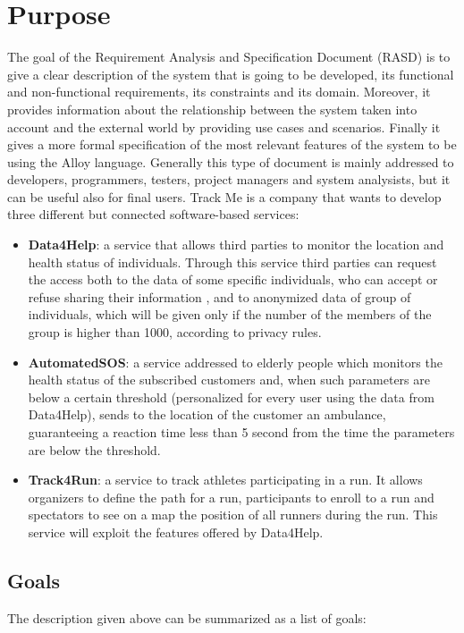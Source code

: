 \section{Purpose}
The  goal of the Requirement Analysis and Specification Document (RASD) is to give a clear description of the system that is going to be developed, its functional and non-functional requirements, its constraints and its domain. Moreover, it provides information about the relationship between the system taken into account and the external world by providing use cases and scenarios. Finally it gives a more formal specification of the most relevant features of the system to be using the Alloy language.
Generally this type of document is mainly addressed to developers, programmers, testers, project managers and system analysists, but it can be useful also for final users.
Track Me is a company that wants to develop three different but connected software-based services:
\begin{itemize}
  \item \textbf{Data4Help}: a service that allows third parties to monitor the location and health status of individuals. Through this service third parties can request the access both to the data of some specific individuals, who can accept or refuse sharing their information , and to anonymized data of group of individuals, which will be given only if the number of the members of the group is higher than 1000, according to privacy rules.
  \item \textbf{AutomatedSOS}: a service addressed to elderly people which monitors the health status of the subscribed customers and, when such parameters are below a certain threshold (personalized for every user using the data from Data4Help), sends to the location of the customer an ambulance, guaranteeing a reaction time less than 5 second from the time the parameters are below the threshold.
  \item \textbf{Track4Run}: a service to track athletes participating in a run. It allows organizers to define the path for a run, participants to enroll to a run and spectators to see on a map the position of all runners during the run. This service will exploit the features offered by Data4Help.
\end{itemize}

\subsection{Goals}
The description given above can be summarized as a list of goals:
